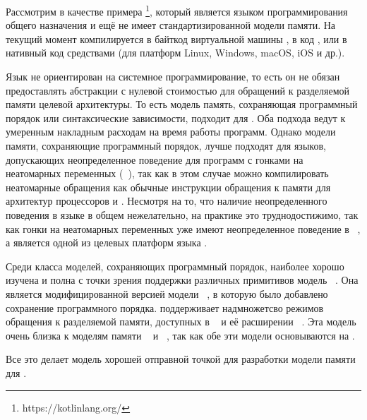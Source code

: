 Рассмотрим в качестве примера \Kotlin\footnote{https://kotlinlang.org/}, который является языком программирования общего назначения и ещё не имеет стандартизированной модели памяти. 
На текущий момент \Kotlin  компилируется  в байткод виртуальной машины \Java, в код \JS, 
или в нативный код средствами \LLVM
(для платформ Linux, Windows, macOS, iOS и др.).

Язык не ориентирован на системное программирование, 
то есть он не обязан предоставлять абстракции с нулевой стоимостью
для обращений к разделяемой памяти целевой архитектуры. 
То есть модель память, сохраняющая программный порядок 
или синтаксические зависимости, подходит для \Kotlin. 
Оба подхода ведут к умеренным накладным расходам 
на время работы программ. 
Однако модели памяти, сохраняющие программный порядок,
лучше подходят для языков, допускающих неопределенное поведение
для программ с гонками на неатомарных переменных
(\see~\cite{Ou-Demsky:OOPSLA18}), 
так как в этом случае можно компилировать неатомарные обращения
как обычные инструкции обращения к памяти для архитектур процессоров \ARM и \POWER.
Несмотря на то, что наличие неопределенного поведения в языке 
\Kotlin в общем нежелательно, на практике это труднодостижимо, 
так как гонки на неатомарных переменных уже имеют 
неопределенное поведение в \LLVM~\cite{Chakraborty-Vafeiadis:CGO17},
а \LLVM является одной из целевых платформ языка \Kotlin.

Среди класса моделей, сохраняющих программный порядок, наиболее 
хорошо изучена и полна с точки зрения поддержки 
различных примитивов  модель \RCMM~\cite{Lahav-al:PLDI17}. Она  
является  модифицированной версией модели \CMM~\cite{Batty-al:POPL11}, 
в которую было добавлено сохранение программного порядка.
\RCMM поддерживает надмножетсво режимов обращения к разделяемой памяти, 
доступных в \JMM~\cite{Manson-al:POPL05} и её расширении \JAM~\cite{Bender-Palsberg:OOPSLA19}. 
Эта модель очень близка к моделям памяти 
\JS~\cite{Watt-al:PLDI2020} и \LLVM~\cite{Chakraborty-Vafeiadis:CGO17}, 
так как обе эти модели основываются на  \CMM.

Все это делает модель \RCMM хорошей отправной точкой для разработки модели памяти для \Kotlin.